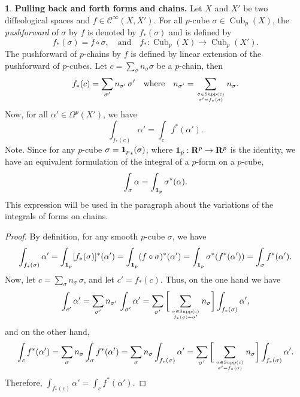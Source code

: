 \documentclass[11pt,reqno]{amsart}
\theoremstyle{definition}
\newtheorem{article}{}
\newcommand{\artlabel}[1]{{\bf #1.}}
\newcommand{\qmbox}[1]{\quad \mbox{#1}\quad}
\newcommand{\RR}{{\mathbf R}}
\def \X{{X}}
\newcommand{\cC}{{\mathcal C}}
\newcommand{\Cub}{\operatorname{Cub}}
\newcommand{\Cinf}{{\cC}^\infty}
\newcommand{\id}{{\bf 1}}
\newcommand{\Supp}{\operatorname{Supp}}
\begin{document}
  \begin{article}\artlabel{Pulling back and forth forms and chains}
    \label{Pulling-back-and-forth-forms-and-chains}
    Let $\X$ and $\X'$ be two diffeological spaces and $f
      \in \Cinf(\X,\X')$. For all $p$-cube $\sigma \in
        \Cub_p(\X)$, the {\em pushforward} of $\sigma$ by $f$ is
    denoted by $f_*(\sigma)$ and is defined by
    $$
      f_*(\sigma) = f \circ \sigma,
       \qmbox{and}  f_* : \Cub_p(\X) \to \Cub_p(\X').
      $$
    The pushforward
    of $p$-chains by $f$ is defined by linear extension of the
    pushforward of $p$-cubes. Let $c = \sum_\sigma n_\sigma \sigma$ be a $p$-chain, then
    $$
      f_*(c) = \sum_{\sigma'}
      n_{\sigma'}\, \sigma' \qmbox{where} n_{\sigma'} =
      \sum_{\sigma \in \Supp(c) \atop \sigma' = f_*(\sigma)} n_\sigma.
      $$
    Now, for all
    $\alpha' \in \Omega^p(\X')$, we have
    $$
      \int_{f_*(c)} \alpha' = \int_c f^*(\alpha').
      $$ 
    {\sc Note.} Since for any $p$-cube $\sigma =
      {\id_p}_*(\sigma)$, where $\id_p : \RR^p \to \RR^p$ is the
    identity, we have an equivalent formulation of the
    integral of a $p$-form on a $p$-cube, 
    $$
      \int_\sigma \alpha = \int_{\id_p} \sigma^*(\alpha).
      $$
    This expression will be used in the
    paragraph about the variations of the integrals of forms on chains.
  \end{article} %
  
  \begin{proof} By definition, for any smooth
    $p$-cube $\sigma$, we have
    $$ \int_{f_*(\sigma)}
      \alpha' = \int_{\id_p} [f_*(\sigma)]^*(\alpha') =
      \int_{\id_p} (f \circ \sigma)^*(\alpha') =
      \int_{\id_p}\sigma^*(f^*(\alpha')) 
      = \int_{\sigma}f^*(\alpha').
      $$
    Now, let $c = \sum_\sigma n_\sigma \, \sigma$, and let
    $c' = f_*(c)$. Thus, on the one hand we have
    $$
      \int_{c'} \alpha' = \sum_{\sigma'} n_{\sigma'} \,
      \int_{\sigma'} \alpha' = \sum_{\sigma'} \bigg[
      \sum_{\sigma \in \Supp(c) \atop  f_*(\sigma) = \sigma'} n_\sigma \bigg]
      \int_{f_*(\sigma)} \alpha',
      $$
    and on the other hand,
    $$
      \int_c f^*(\alpha') = \sum_\sigma n_\sigma \int_\sigma
      f^*(\alpha') = \sum_\sigma n_\sigma \int_{f_*(\sigma)}
      \alpha' = \sum_{\sigma'} \bigg[ \sum_{\sigma \in \Supp(c)
      \atop \sigma' = f_*(\sigma)} n_\sigma \bigg]
      \int_{f_*(\sigma)} \alpha'.
      $$
    Therefore, $\int_{f_*(c)} \alpha' = \int_c
      f^*(\alpha')$.
  \end{proof}
  
\end{document}
